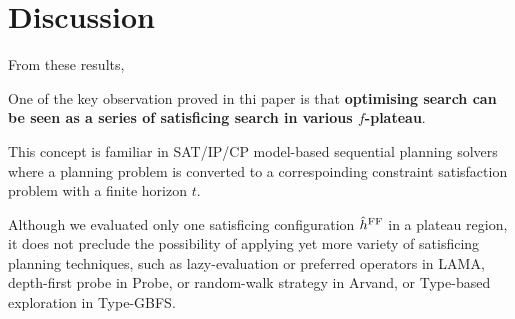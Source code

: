 \clearpage 
\section{Discussion}

From these results, 

One of the key observation proved in thi paper is that
\textbf{optimising search can be seen as a series of satisficing search
in various $f$-plateau}. 

This concept is familiar in
SAT/IP/CP model-based sequential planning solvers where a planning
problem is converted to a correspoinding constraint satisfaction problem
with a finite horizon $t$.

Although we evaluated only one satisficing configuration $\hat{h}^{\text{FF}}$ in a
plateau region, it does not preclude the possibility of applying yet
more variety of satisficing planning techniques, such as lazy-evaluation
or preferred operators in LAMA, depth-first probe in Probe, or
random-walk strategy in Arvand, or Type-based exploration in Type-GBFS.

